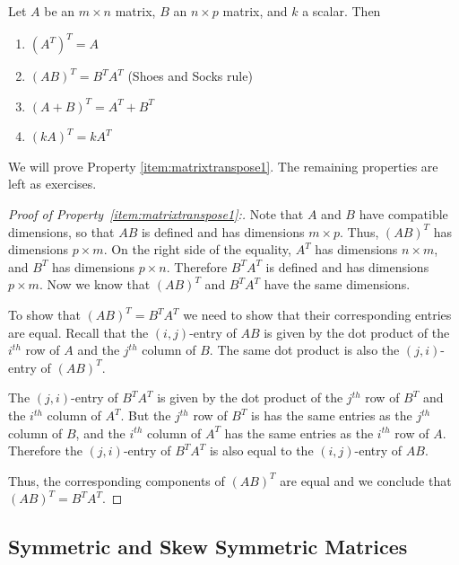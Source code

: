 \documentclass{ximera}
\begin{document}
\begin{theorem}\label{th:transposeproperties}
Let $A$ be an $m\times n$ matrix, $B$ an $n\times p$ matrix, and $k$ a scalar. Then
\begin{enumerate}
\item\label{item:transoftrans}
$\left(A^{T}\right)^{T} = A$
\item\label{item:matrixtranspose1}
$\left( AB\right) ^{T}=B^{T}A^{T} $ (Shoes and Socks rule)
\item\label{item:matrixtranspose2}
$\left( A+ B\right) ^{T}=A^{T}+ B^{T}$  
\item\label{item:matrixtranspose3}
$\left(kA\right)^T=kA^T$
\end{enumerate}
\end{theorem}
We will prove Property \ref{item:matrixtranspose1}.  The remaining properties are left as exercises.
\begin{proof}[Proof of Property~\ref{item:matrixtranspose1}:]
Note that $A$ and $B$ have compatible dimensions, so that $AB$ is defined and has dimensions $m\times p$.  Thus, $(AB)^T$ has dimensions $p\times m$.  On the right side of the equality, $A^T$ has dimensions $n\times m$, and $B^T$ has dimensions $p\times n$.  Therefore $B^TA^T$ is defined and has dimensions $p\times m$.  Now we know that $(AB)^T$ and $B^TA^T$ have the same dimensions.

To show that $(AB)^T=B^TA^T$ we need to show that their corresponding entries are equal. 
Recall that the $(i,j)$-entry of $AB$ is given by
the dot product of the $i^{th}$ row of $A$ and the $j^{th}$ column of $B$.  
The same dot product is also the $(j,i)$-entry of $(AB)^T$.  

The $(j,i)$-entry of $B^TA^T$ is given by the dot product of the $j^{th}$ row of $B^T$ and the $i^{th}$ column of $A^T$.  But the $j^{th}$ row of $B^T$ is has the same entries as the $j^{th}$ column of $B$, and   the $i^{th}$ column of $A^T$ has the same entries as the $i^{th}$ row of $A$.  Therefore the $(j,i)$-entry of $B^TA^T$ is also equal to the $(i,j)$-entry of $AB$.

Thus, the corresponding components of $(AB)^T$ are equal and we conclude that $(AB)^T=B^TA^T$.
\end{proof}

\subsection*{Symmetric and Skew Symmetric Matrices}
\end{document}
